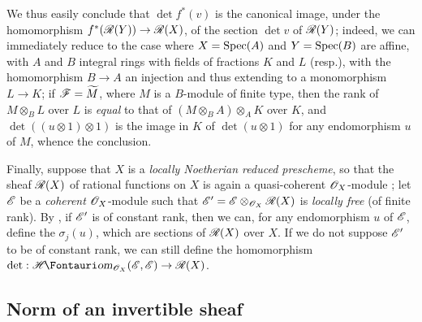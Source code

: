 \begin{env}[6.4.9]
We thus easily conclude that $\det f^*(v)$ is the canonical image, under the homomorphism $f^*(\sh{R}(Y))\to\sh{R}(X)$, of the section $\det v$ of $\mathscr{R}(Y)$;
indeed, we can immediately reduce to the case where $X=\operatorname{Spec}(A)$ and $Y=\operatorname{Spec}(B)$ are affine, with $A$ and $B$ integral rings with fields of fractions $K$ and $L$ (resp.), with the homomorphism $B\to A$ an injection and thus extending to a monomorphism $L\to K$;
if $\mathscr{F}=\widetilde{M}$, where $M$ is a $B$-module of finite type, then the rank of $M\otimes_B L$ over $L$ is \emph{equal} to that of $(M\otimes_B A)\otimes_A K$ over $K$, and $\det((u\otimes1)\otimes1)$ is the image in $K$ of $\det(u\otimes1)$ for any endomorphism $u$ of $M$, whence the conclusion.
\end{env}

\begin{env}[6.4.10]
\label{II.6.4.10}
Finally, suppose that $X$ is a \emph{locally Noetherian reduced prescheme}, so that the sheaf $\mathscr{R}(X)$ of rational functions on $X$ is again a quasi-coherent $\mathscr{O}_X$-module ;
let $\mathscr{E}$ be a \emph{coherent} $\mathscr{O}_X$-module such that $\mathscr{E}'=\mathscr{E}\otimes_{\mathscr{O}_X}\mathscr{R}(X)$ is \emph{locally free} (of finite rank).
By , if $\mathscr{E}'$ is of constant rank, then we can, for any endomorphism $u$ of $\mathscr{E}$, define the $\sigma_j(u)$, which are sections of $\mathscr{R}(X)$ over $X$.
If we do not suppose $\mathscr{E}'$ to be of constant rank, we can still define the homomorphism $\det:\shHom_{\sh{O}_X}(\sh{E},\sh{E})\to\sh{R}(X)$.
\end{env}


\subsection{Norm of an invertible sheaf}
\label{subsection:II.6.5}

